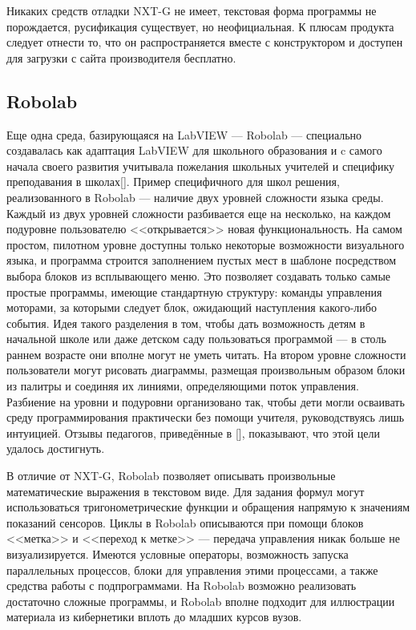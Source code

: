 \documentclass[a5paper]{article}
\begin{document}
Никаких средств отладки NXT-G не имеет, текстовая форма программы не порождается, русификация существует, 
но неофициальная. К плюсам продукта следует отнести то, что он распространяется вместе с конструктором и 
доступен для загрузки с сайта производителя бесплатно.

\subsection{Robolab}

Еще одна среда, базирующаяся на LabVIEW --- Robolab --- специально создавалась как адаптация LabVIEW 
для школьного образования и c самого начала своего развития учитывала пожелания школьных учителей и специфику 
преподавания в школах[]. Пример специфичного для школ решения, реализованного в Robolab --- наличие двух уровней 
сложности языка среды. Каждый из двух уровней сложности разбивается еще на несколько, на каждом подуровне пользователю 
<<открывается>> новая функциональность. На самом простом, пилотном уровне доступны только некоторые возможности 
визуального языка, и программа строится заполнением пустых мест в шаблоне посредством выбора блоков из всплывающего 
меню. Это позволяет создавать только самые простые программы, имеющие стандартную структуру: команды управления 
моторами, за которыми следует блок, ожидающий наступления какого-либо события. Идея такого разделения в том, 
чтобы дать возможность детям в начальной школе или даже детском саду пользоваться программой --- в столь раннем 
возрасте они вполне могут не уметь читать. На втором уровне сложности пользователи могут рисовать диаграммы, 
размещая произвольным образом блоки из палитры и соединяя их линиями, определяющими поток управления. Разбиение 
на уровни и подуровни организовано так, чтобы дети могли осваивать среду программирования практически без помощи 
учителя, руководствуясь лишь интуицией. Отзывы педагогов, приведённые в [], показывают, что этой цели удалось достигнуть.

В отличие от NXT-G, Robolab позволяет описывать произвольные математические выражения в текстовом виде. Для 
задания формул могут использоваться тригонометрические функции и обращения напрямую к значениям показаний сенсоров. 
Циклы в Robolab описываются при помощи блоков <<метка>> и <<переход к метке>> --- передача управления никак больше 
не визуализируется. Имеются условные операторы, возможность запуска параллельных процессов, блоки для управления 
этими процессами, а также средства работы с подпрограммами. На Robolab возможно реализовать достаточно сложные 
программы, и Robolab вполне подходит для иллюстрации материала из кибернетики вплоть до младших курсов вузов.
\end{document}
